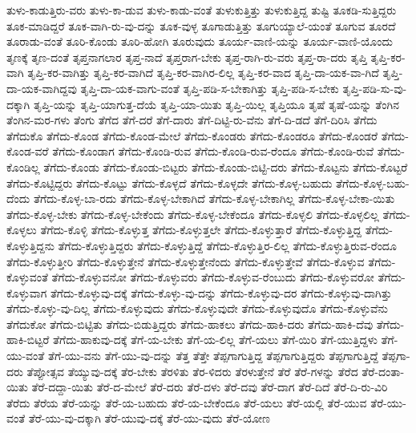 {ತುಳು-ಕಾಡುತ್ತಿರು-ವರು
ತುಳು-ಕಾ-ಡುವ
ತುಳು-ಕಾಡು-ವಂತೆ
ತುಳುಕುತ್ತಿತ್ತು
ತುಳುಕುತ್ತಿದ್ದ
ತುಷ್ಟಿ
ತೂಕಡಿ-ಸುತ್ತಿದ್ದರು
ತೂಕ-ಮಾಡಿದ್ದರೆ
ತೂಕ-ವಾಗಿ-ರು-ವು-ದನ್ನು
ತೂಕ-ವುಳ್ಳ
ತೂಗಾಡುತ್ತಿತ್ತು
ತೂಗುಯ್ಯಾಲೆ-ಯಂತೆ
ತೂಗುವ
ತೂರದೆ
ತೂರಾಡು-ವಂತೆ
ತೂರಿ-ಕೊಂಡು
ತೂರಿ-ಹೋಗಿ
ತೂರುವುದು
ತೂರ್ಯ-ವಾಣಿ-ಯನ್ನು
ತೂರ್ಯ-ವಾಣಿ-ಯೊಂದು
ತೃಣಕ್ಕೆ
ತೃಣ-ದಂತೆ
ತೃಪ್ತನಾಗಲಾರ
ತೃಪ್ತ-ನಾದೆ
ತೃಪ್ತರಾಗ-ಬೇಕು
ತೃಪ್ತ-ರಾಗಿ-ರು-ವರು
ತೃಪ್ತ-ರಾ-ದರು
ತೃಪ್ತಿ
ತೃಪ್ತಿ-ಕರ-ವಾಗಿ
ತೃಪ್ತಿ-ಕರ-ವಾಗಿತ್ತು
ತೃಪ್ತಿ-ಕರ-ವಾಗಿದೆ
ತೃಪ್ತಿ-ಕರ-ವಾಗಿರ-ಲಿಲ್ಲ
ತೃಪ್ತಿ-ಕರ-ವಾದ
ತೃಪ್ತಿ-ದಾ-ಯಕ-ವಾ-ಗಿದೆ
ತೃಪ್ತಿ-ದಾ-ಯಕ-ವಾಗಿದ್ದವು
ತೃಪ್ತಿ-ದಾ-ಯಕ-ವಾಗು-ವಂತೆ
ತೃಪ್ತಿ-ಪಡಿ-ಸ-ಬೇಕಾಗಿತ್ತು
ತೃಪ್ತಿ-ಪಡಿ-ಸ-ಬೇಕು
ತೃಪ್ತಿ-ಪಡಿ-ಸು-ವು-ದಕ್ಕಾಗಿ
ತೃಪ್ತಿ-ಯನ್ನು
ತೃಪ್ತಿ-ಯಾಗುತ್ತ-ದೆಯೆ
ತೃಪ್ತಿ-ಯಾ-ಯಿತು
ತೃಪ್ತಿ-ಯಿಲ್ಲ
ತೃಪ್ತಿಯೂ
ತೃಷೆ
ತೃಷೆ-ಯನ್ನು
ತೆಂಗಿನ
ತೆಂಗಿನ-ಮರ-ಗಳು
ತೆಂಗು
ತೆಗೆದ
ತೆಗೆ-ದರೆ
ತೆಗೆ-ದಾರು
ತೆಗೆ-ದಿಟ್ಟಿ-ರು-ವೆನು
ತೆಗೆ-ದಿ-ಡದೆ
ತೆಗೆ-ದಿರಿಸಿ
ತೆಗೆದು
ತೆಗೆದುಕೊ
ತೆಗೆದು-ಕೊಂಡ
ತೆಗೆದು-ಕೊಂಡ-ಮೇಲೆ
ತೆಗೆದು-ಕೊಂಡರು
ತೆಗೆದು-ಕೊಂಡರೂ
ತೆಗೆದು-ಕೊಂಡರೆ
ತೆಗೆದು-ಕೊಂಡ-ವರೆ
ತೆಗೆದು-ಕೊಂಡಾಗ
ತೆಗೆದು-ಕೊಂಡಿ-ರುವ
ತೆಗೆದು-ಕೊಂಡಿ-ರುವ-ರೆಂದೂ
ತೆಗೆದು-ಕೊಂಡಿ-ರುವೆ
ತೆಗೆದು-ಕೊಂಡಿಲ್ಲ
ತೆಗೆದು-ಕೊಂಡು
ತೆಗೆದು-ಕೊಂಡು-ಬಿಟ್ಟರು
ತೆಗೆದು-ಕೊಂಡು-ಬಿಟ್ಟಿ-ದರು
ತೆಗೆದು-ಕೊಟ್ಟನು
ತೆಗೆದು-ಕೊಟ್ಟರೆ
ತೆಗೆದು-ಕೊಟ್ಟಿದ್ದರು
ತೆಗೆದು-ಕೊಟ್ಟು
ತೆಗೆದು-ಕೊಳ್ಳದೆ
ತೆಗೆದು-ಕೊಳ್ಳದೇ
ತೆಗೆದು-ಕೊಳ್ಳ-ಬಹುದು
ತೆಗೆದು-ಕೊಳ್ಳ-ಬಹು-ದೆಂದು
ತೆಗೆದು-ಕೊಳ್ಳ-ಬಾ-ರದು
ತೆಗೆದು-ಕೊಳ್ಳ-ಬೇಕಾಗಿದೆ
ತೆಗೆದು-ಕೊಳ್ಳ-ಬೇಕಾಗಿಲ್ಲ
ತೆಗೆದು-ಕೊಳ್ಳ-ಬೇಕಾ-ಯಿತು
ತೆಗೆದು-ಕೊಳ್ಳ-ಬೇಕು
ತೆಗೆದು-ಕೊಳ್ಳ-ಬೇಕೆಂದು
ತೆಗೆದು-ಕೊಳ್ಳ-ಬೇಕೆಂದೂ
ತೆಗೆದು-ಕೊಳ್ಳಲಿ
ತೆಗೆದು-ಕೊಳ್ಳಲಿಲ್ಲ
ತೆಗೆದು-ಕೊಳ್ಳಲು
ತೆಗೆದು-ಕೊಳ್ಳಿ
ತೆಗೆದು-ಕೊಳ್ಳುತ್ತ
ತೆಗೆದು-ಕೊಳ್ಳುತ್ತಲೇ
ತೆಗೆದು-ಕೊಳ್ಳುತ್ತಾರೆ
ತೆಗೆದು-ಕೊಳ್ಳುತ್ತಿದ್ದ
ತೆಗೆದು-ಕೊಳ್ಳುತ್ತಿದ್ದನು
ತೆಗೆದು-ಕೊಳ್ಳುತ್ತಿದ್ದರು
ತೆಗೆದು-ಕೊಳ್ಳುತ್ತಿದ್ದೆ
ತೆಗೆದು-ಕೊಳ್ಳುತ್ತಿರ-ಲಿಲ್ಲ
ತೆಗೆದು-ಕೊಳ್ಳುತ್ತಿರುವ-ರೆಂದೂ
ತೆಗೆದು-ಕೊಳ್ಳುತ್ತೀರಿ
ತೆಗೆದು-ಕೊಳ್ಳುತ್ತೇನೆ
ತೆಗೆದು-ಕೊಳ್ಳುತ್ತೇನೆಂದು
ತೆಗೆದು-ಕೊಳ್ಳುತ್ತೇವೆ
ತೆಗೆದು-ಕೊಳ್ಳುವ
ತೆಗೆದು-ಕೊಳ್ಳುವಂತೆ
ತೆಗೆದು-ಕೊಳ್ಳುವನೋ
ತೆಗೆದು-ಕೊಳ್ಳುವರು
ತೆಗೆದು-ಕೊಳ್ಳುವ-ರೆಂಬುದು
ತೆಗೆದು-ಕೊಳ್ಳುವರೋ
ತೆಗೆದು-ಕೊಳ್ಳುವಾಗ
ತೆಗೆದು-ಕೊಳ್ಳುವು-ದಕ್ಕೆ
ತೆಗೆದು-ಕೊಳ್ಳು-ವು-ದನ್ನು
ತೆಗೆದು-ಕೊಳ್ಳುವು-ದರ
ತೆಗೆದು-ಕೊಳ್ಳುವು-ದಾಗಿತ್ತು
ತೆಗೆದು-ಕೊಳ್ಳು-ವು-ದಿಲ್ಲ
ತೆಗೆದು-ಕೊಳ್ಳುವುದು
ತೆಗೆದು-ಕೊಳ್ಳುವುದೇ
ತೆಗೆದು-ಕೊಳ್ಳುವುದೊ
ತೆಗೆದು-ಕೊಳ್ಳುವೆನು
ತೆಗೆದುಕೋ
ತೆಗೆದು-ಬಿಟ್ಟಿತು
ತೆಗೆದು-ಬಿಡುತ್ತಿದ್ದರು
ತೆಗೆದು-ಹಾಕಲು
ತೆಗೆದು-ಹಾಕಿ-ದರು
ತೆಗೆದು-ಹಾಕಿ-ದೆವು
ತೆಗೆದು-ಹಾಕಿ-ಬಿಟ್ಟರೆ
ತೆಗೆದು-ಹಾಕುವು-ದಕ್ಕೆ
ತೆಗೆ-ಯ-ಬೇಕು
ತೆಗೆ-ಯ-ಲಿಲ್ಲ
ತೆಗೆ-ಯಲು
ತೆಗೆ-ಯಿರಿ
ತೆಗೆ-ಯುತ್ತಿದ್ದಳು
ತೆಗೆ-ಯು-ವಂತೆ
ತೆಗೆ-ಯು-ವನು
ತೆಗೆ-ಯು-ವು-ದನ್ನು
ತೆತ್ತ
ತೆತ್ತೇ
ತೆಪ್ಪಗಾಗುತ್ತಿದ್ದ
ತೆಪ್ಪಗಾಗುತ್ತಿದ್ದರು
ತೆಪ್ಪಗಾಗುತ್ತಿದ್ದೆ
ತೆಪ್ಪಗಾ-ದರು
ತೆಪ್ಪೋತ್ಸವ
ತೆಯ್ಯುವು-ದಕ್ಕೆ
ತೆರ-ಬೇಕು
ತೆರಳಿತು
ತೆರ-ಳಿದರು
ತೆರಳುತ್ತೇನೆ
ತೆರೆ
ತೆರೆ-ಗಳನ್ನು
ತೆರೆದ
ತೆರೆ-ದಂತಾ-ಯಿತು
ತೆರೆ-ದದ್ದಾ-ಯಿತು
ತೆರೆ-ದ-ಮೇಲೆ
ತೆರೆ-ದರು
ತೆರೆ-ದಳು
ತೆರೆ-ದವು
ತೆರೆ-ದಾಗ
ತೆರೆ-ದಿದೆ
ತೆರೆ-ದಿ-ರು-ವಿರಿ
ತೆರೆದು
ತೆರೆಯ
ತೆರೆ-ಯನ್ನು
ತೆರೆ-ಯ-ಬಹುದು
ತೆರೆ-ಯ-ಬೇಕೆಂದೂ
ತೆರೆ-ಯಲು
ತೆರೆ-ಯಲ್ಲಿ
ತೆರೆ-ಯುವ
ತೆರೆ-ಯು-ವಂತೆ
ತೆರೆ-ಯು-ವು-ದಕ್ಕಾಗಿ
ತೆರೆ-ಯುವು-ದಕ್ಕೆ
ತೆರೆ-ಯು-ವುದು
ತೆರೆ-ಯೋಣ
}
